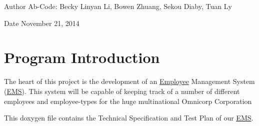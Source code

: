 \begin{DoxyAuthor}{Author}
Ab-\/\-Code\-: Becky Linyan Li, Bowen Zhuang, Sekou Diaby, Tuan Ly 
\end{DoxyAuthor}
\begin{DoxyDate}{Date}
November 21, 2014 
\end{DoxyDate}
\hypertarget{index_intro}{}\section{Program Introduction}\label{index_intro}
The heart of this project is the development of an \hyperlink{namespace_employee}{Employee} Management System (\hyperlink{namespace_e_m_s}{E\-M\-S}). This system will be capable of keeping track of a number of different employees and employee-\/types for the huge multinational Omnicorp Corporation \par
 This doxygen file contains the Technical Specification and Test Plan of our \hyperlink{namespace_e_m_s}{E\-M\-S}. 